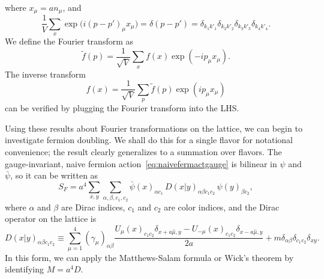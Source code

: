where $x_\mu=an_\mu$, and
\begin{equation}
  \frac{1}{V}\sum_x\exp\big(i(p-p')_\mu x_\mu\big)
  =\delta(p-p')
  =\delta_{k_1k'_1}\delta_{k_2k'_2}\delta_{k_3k'_3}\delta_{k_4k'_4}.
\end{equation}
We define the Fourier transform as
\begin{equation}\label{eq:latft}
  \tilde{f}(p)=\frac{1}{\sqrt{V}}\sum_xf(x)\exp(-ip_\mu x_\mu).
\end{equation}
The inverse transform
\begin{equation}\label{eq:latift}
  f(x)=\frac{1}{\sqrt{V}}\sum_p\tilde{f}(p)\exp(ip_\mu x_\mu)
\end{equation}
can be verified by plugging the Fourier transform into the LHS.

Using these results about Fourier transformations on the lattice, we
can begin to investigate fermion doubling. We shall do this for
a single flavor for notational convenience; the result clearly
generalizes to a summation over flavors. 
The gauge-invariant, naive
fermion action~\eqref{eq:naivefermactgauge} is bilinear in $\psi$
and $\bar{\psi}$, so it can be written as
\begin{equation}
  S_F=a^4\sum_{x,y}\sum_{\alpha,\beta,c_1,c_2}\bar{\psi}(x)_{\alpha c_1}
      \,D(x|y)_{\alpha \beta c_1 c_2}\,\psi(y)_{\beta c_2},
\end{equation}
where $\alpha$ and $\beta$ are Dirac indices, $c_1$ and $c_2$ are
color indices, and the Dirac operator on the lattice is
\begin{equation}
  D(x|y)_{\alpha\beta c_1c_2}\equiv\sum_{\mu=1}^4(\gamma_\mu)_{\alpha\beta}
   \frac{U_\mu(x)_{c_1c_2}\delta_{x+a\hat{\mu},y}
         -U_{-\mu}(x)_{c_1c_2}\delta_{x-a\hat{\mu},y}}{2a}
   +m\delta_{\alpha\beta}\delta_{c_1c_2}\delta_{xy}.
\end{equation}
In this form, we can apply the Matthews-Salam formula or Wick's
theorem by identifying $M=a^4D$. 

